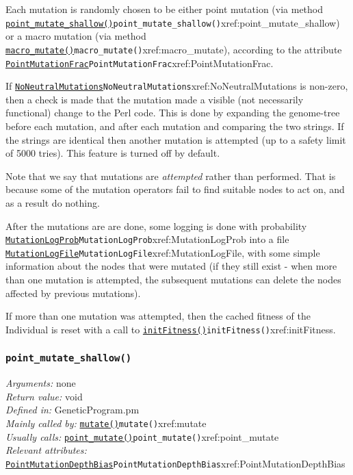 \documentclass[a4paper]{article}
\begin{document}
Each mutation is randomly chosen to be either point mutation (via
method \hyperref[no]{\texttt{point\_mutate\_shallow()}}{\texttt{point\_mutate\_shallow()}}{xref:point_mutate_shallow}) or a macro mutation (via
method \hyperref[no]{\texttt{macro\_mutate()}}{\texttt{macro\_mutate()}}{xref:macro_mutate}), according to the attribute
\hyperref[no]{\texttt{PointMutationFrac}}{\texttt{PointMutationFrac}}{xref:PointMutationFrac}.

If \hyperref[no]{\texttt{NoNeutralMutations}}{\texttt{NoNeutralMutations}}{xref:NoNeutralMutations} is non-zero, then a check is made that
the mutation made a visible (not necessarily functional) change to the
Perl code.  This is done by expanding the genome-tree before each
mutation, and after each mutation and comparing the two strings.  If
the strings are identical then another mutation is attempted (up to a
safety limit of 5000 tries).  This feature is turned off by default.

Note that we say that mutations are \textit{attempted} rather than
performed.  That is because some of the mutation operators fail to
find suitable nodes to act on, and as a result do nothing.

After the mutations are are done, some logging is done with
probability \hyperref[no]{\texttt{MutationLogProb}}{\texttt{MutationLogProb}}{xref:MutationLogProb} into a file
\hyperref[no]{\texttt{MutationLogFile}}{\texttt{MutationLogFile}}{xref:MutationLogFile}, with some simple information about the nodes
that were mutated (if they still exist - when more than one mutation
is attempted, the subsequent mutations can delete the nodes affected
by previous mutations).

If more than one mutation was attempted, then the cached fitness of
the Individual is reset with a call to \hyperref[no]{\texttt{initFitness()}}{\texttt{initFitness()}}{xref:initFitness}.


\subsubsection{\texttt{point\_mutate\_shallow()}}\label{xref:point_mutate_shallow}
\begin{flushleft}
\textit{Arguments:} none\\
\textit{Return value:} void\\
\textit{Defined in:} GeneticProgram.pm\\
\textit{Mainly called by:} \hyperref[no]{\texttt{mutate()}}{\texttt{mutate()}}{xref:mutate}\\
\textit{Usually calls:} \hyperref[no]{\texttt{point\_mutate()}}{\texttt{point\_mutate()}}{xref:point_mutate}\\
\textit{Relevant attributes:} \hyperref[no]{\texttt{PointMutationDepthBias}}{\texttt{PointMutationDepthBias}}{xref:PointMutationDepthBias}
\end{flushleft}
\end{document}
